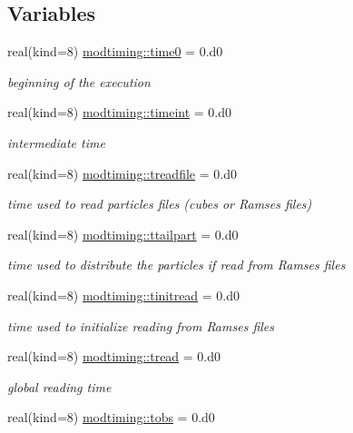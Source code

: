\subsection*{Variables}
\begin{DoxyCompactItemize}
\item 
real(kind=8) \hyperlink{namespacemodtiming_aa15cbf8a08e28c5209481b3ed5f11090}{modtiming\+::time0} = 0.d0
\begin{DoxyCompactList}\small\item\em beginning of the execution \end{DoxyCompactList}\item 
real(kind=8) \hyperlink{namespacemodtiming_a724cb127b8168bf0645e4070d83a34c0}{modtiming\+::timeint} = 0.d0
\begin{DoxyCompactList}\small\item\em intermediate time \end{DoxyCompactList}\item 
real(kind=8) \hyperlink{namespacemodtiming_ab585192644ed79fc1030fde80dd84f85}{modtiming\+::treadfile} = 0.d0
\begin{DoxyCompactList}\small\item\em time used to read particles files (cubes or Ramses files) \end{DoxyCompactList}\item 
real(kind=8) \hyperlink{namespacemodtiming_a65a8925f0685c0a5c5e42b0afd3b4a69}{modtiming\+::ttailpart} = 0.d0
\begin{DoxyCompactList}\small\item\em time used to distribute the particles if read from Ramses files \end{DoxyCompactList}\item 
real(kind=8) \hyperlink{namespacemodtiming_a6c37469e0c299e5eb7c4b21eec1f2405}{modtiming\+::tinitread} = 0.d0
\begin{DoxyCompactList}\small\item\em time used to initialize reading from Ramses files \end{DoxyCompactList}\item 
real(kind=8) \hyperlink{namespacemodtiming_ab77d3fc2a7e3da662677204c1c8f7e84}{modtiming\+::tread} = 0.d0
\begin{DoxyCompactList}\small\item\em global reading time \end{DoxyCompactList}\item 
real(kind=8) \hyperlink{namespacemodtiming_a83f5f02456356934410977b127c6308c}{modtiming\+::tobs} = 0.d0

\end{DoxyCompactItemize}
